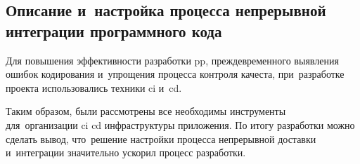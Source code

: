 \subsection{Описание и~настройка процесса непрерывной интеграции программного кода}
\label{sec:testing:ci}

Для повышения эффективности разработки \gls{pp}, преждевременного выявления ошибок кодирования и~упрощения процесса контроля качеста, при~разработке проекта использовались техники \gls{ci} и~\gls{cd}.







Таким образом, были рассмотрены все необходимы инструменты для~организации \gls{ci} \gls{cd} инфраструктуры приложения. По итогу разработки можно сделать вывод, что~решение настройки процесса непрерывной доставки и~интеграции значительно ускорил процесс разработки.